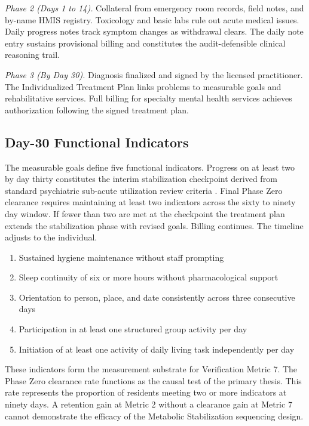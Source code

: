 \documentclass[12pt, letterpaper]{article}
\begin{document}
\textit{Phase 2 (Days 1 to 14).} Collateral from emergency room records, field notes, and by-name HMIS registry. Toxicology and basic labs rule out acute medical issues. Daily progress notes track symptom changes as withdrawal clears. The daily note entry sustains provisional billing and constitutes the audit-defensible clinical reasoning trail.

\textit{Phase 3 (By Day 30).} Diagnosis finalized and signed by the licensed practitioner. The Individualized Treatment Plan links problems to measurable goals and rehabilitative services. Full billing for specialty mental health services achieves authorization following the signed treatment plan.

\subsection{Day-30 Functional Indicators}

The measurable goals define five functional indicators. Progress on at least two by day thirty constitutes the interim stabilization checkpoint derived from standard psychiatric sub-acute utilization review criteria \citep{dhcs_mhrc_2024}. Final Phase Zero clearance requires maintaining at least two indicators across the sixty to ninety day window. If fewer than two are met at the checkpoint the treatment plan extends the stabilization phase with revised goals. Billing continues. The timeline adjusts to the individual.

\begin{enumerate}[nosep, leftmargin=2.5em]
  \item Sustained hygiene maintenance without staff prompting
  \item Sleep continuity of six or more hours without pharmacological support
  \item Orientation to person, place, and date consistently across three consecutive days
  \item Participation in at least one structured group activity per day
  \item Initiation of at least one activity of daily living task independently per day
\end{enumerate}

These indicators form the measurement substrate for Verification Metric 7. The Phase Zero clearance rate functions as the causal test of the primary thesis. This rate represents the proportion of residents meeting two or more indicators at ninety days. A retention gain at Metric 2 without a clearance gain at Metric 7 cannot demonstrate the efficacy of the Metabolic Stabilization sequencing design.
\end{document}
